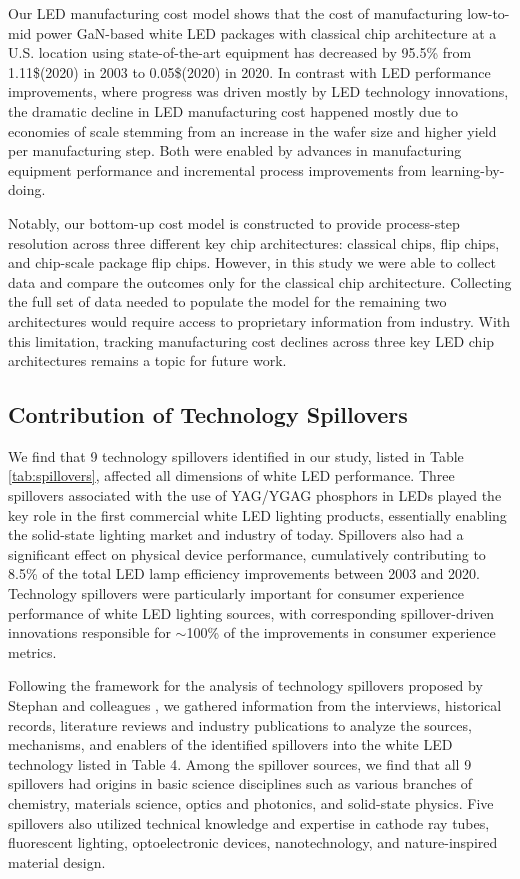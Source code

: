 \documentclass[twoside,twocolumn,9pt]{article}
\begin{document}
Our LED manufacturing cost model shows that the cost of manufacturing low-to-mid power GaN-based white LED packages with classical chip architecture at a U.S. location using state-of-the-art equipment has decreased by 95.5\% from 1.11\$(2020) in 2003 to 0.05\$(2020) in 2020. In contrast with LED performance improvements, where progress was driven mostly by LED technology innovations, the dramatic decline in LED manufacturing cost happened mostly due to economies of scale stemming from an increase in the wafer size and higher yield per manufacturing step. Both were enabled by advances in manufacturing equipment performance and incremental process improvements from learning-by-doing. 

Notably, our bottom-up cost model is constructed to provide process-step resolution across three different key chip architectures: classical chips, flip chips, and chip-scale package flip chips. However, in this study we were able to collect data and compare the outcomes only for the classical chip architecture. Collecting the full set of data needed to populate the model for the remaining two architectures would require access to proprietary information from industry. With this limitation, tracking manufacturing cost declines across three key LED chip architectures remains a topic for future work.

\subsection{Contribution of Technology Spillovers}

We find that 9 technology spillovers identified in our study, listed in Table \ref{tab:spillovers}, affected all dimensions of white LED performance. Three spillovers associated with the use of YAG/YGAG phosphors in LEDs played the key role in the first commercial white LED lighting products, essentially enabling the solid-state lighting market and industry of today. Spillovers also had a significant effect on physical device performance, cumulatively contributing to 8.5\% of the total LED lamp efficiency improvements between 2003 and 2020. Technology spillovers were particularly important for consumer experience performance of white LED lighting sources, with corresponding spillover-driven innovations responsible for $\sim$100\% of the improvements in consumer experience metrics. 

Following the framework for the analysis of technology spillovers proposed by Stephan and colleagues \cite{Stephan2021}, we gathered information from the interviews, historical records, literature reviews and industry publications to analyze the sources, mechanisms, and enablers of the identified spillovers into the white LED technology listed in Table 4. Among the spillover sources, we find that all 9 spillovers had origins in basic science disciplines such as various branches of chemistry, materials science, optics and photonics, and solid-state physics. Five spillovers also utilized technical knowledge and expertise in cathode ray tubes, fluorescent lighting, optoelectronic devices, nanotechnology, and nature-inspired material design. 
\end{document}
